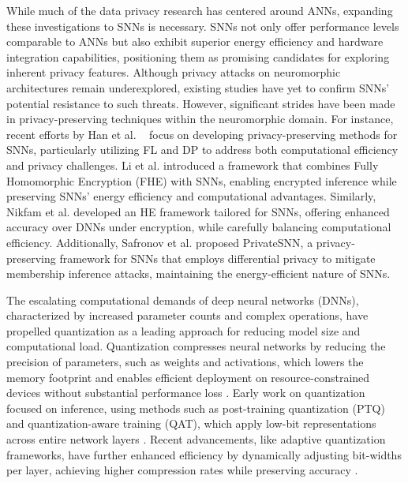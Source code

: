 While much of the data privacy research has centered around ANNs, expanding these investigations to SNNs is necessary. SNNs not only offer performance levels comparable to ANNs but also exhibit superior energy efficiency and hardware integration capabilities, positioning them as promising candidates for exploring inherent privacy features. Although privacy attacks on neuromorphic architectures remain underexplored, existing studies have yet to confirm SNNs' potential resistance to such threats. However, significant strides have been made in privacy-preserving techniques within the neuromorphic domain. For instance, recent efforts by Han et al. ~\cite{han2023towards} focus on developing privacy-preserving methods for SNNs, particularly utilizing FL and DP to address both computational efficiency and privacy challenges. Li et al.\cite{li2023efficient} introduced a framework that combines Fully Homomorphic Encryption (FHE) with SNNs, enabling encrypted inference while preserving SNNs' energy efficiency and computational advantages. Similarly, Nikfam et al.\cite{nikfam2023homomorphic} developed an HE framework tailored for SNNs, offering enhanced accuracy over DNNs under encryption, while carefully balancing computational efficiency. Additionally, Safronov et al.\cite{kim2022privatesnn} proposed PrivateSNN, a privacy-preserving framework for SNNs that employs differential privacy to mitigate membership inference attacks, maintaining the energy-efficient nature of SNNs.


The escalating computational demands of deep neural networks (DNNs), characterized by increased parameter counts and complex operations, have propelled quantization as a leading approach for reducing model size and computational load. Quantization compresses neural networks by reducing the precision of parameters, such as weights and activations, which lowers the memory footprint and enables efficient deployment on resource-constrained devices without substantial performance loss \cite{yang2019quantization, nagel2021white}. Early work on quantization focused on inference, using methods such as post-training quantization (PTQ) and quantization-aware training (QAT), which apply low-bit representations across entire network layers \cite{jacob2018quantization}. Recent advancements, like adaptive quantization frameworks, have further enhanced efficiency by dynamically adjusting bit-widths per layer, achieving higher compression rates while preserving accuracy \cite{tran2024privacy, zhou2021balanced}.

